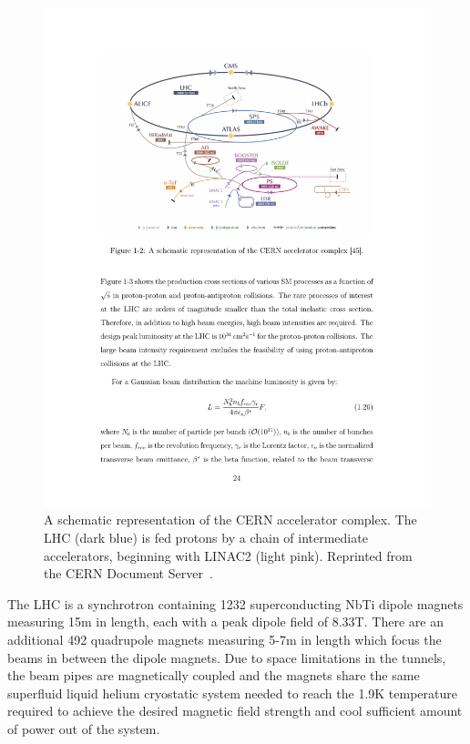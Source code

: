 \begin{figure}[htbp]
  \centering
  \includegraphics[width=.775\textwidth]{Collider/Figures/LHC_diagram.pdf}
  \caption{
    A schematic representation of the CERN accelerator complex. 
    The LHC (dark blue) is fed protons by a chain of intermediate accelerators, beginning with LINAC2 (light pink).
    Reprinted from the CERN Document Server~\cite{Mobs2018}. 
  }
  \label{fig:lhc}
\end{figure}


The LHC is a synchrotron containing 1232 superconducting NbTi dipole magnets measuring 15\unit{m} in length, each with a peak dipole field of 8.33\unit{T}. 
There are an additional 492 quadrupole magnets measuring 5-7\unit{m} in length which focus the beams in between the dipole magnets.
Due to space limitations in the tunnels, the beam pipes are magnetically coupled and the magnets share the same superfluid liquid helium cryostatic system needed to reach the 1.9\unit{K} temperature  required to achieve the desired magnetic field strength and cool sufficient amount of power out of the system.

